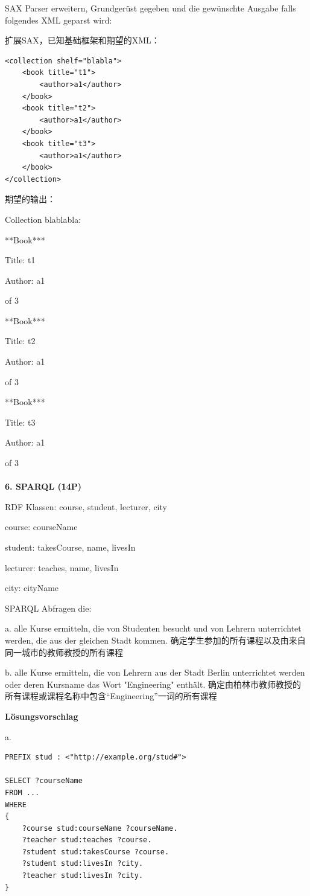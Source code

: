 \documentclass[fontset=windows]{article}
\begin{document}
SAX Parser erweitern, Grundgerüst gegeben und die gewünschte Ausgabe falls folgendes XML geparst wird:

扩展SAX，已知基础框架和期望的XML：

\begin{verbatim}
<collection shelf="blabla">
	<book title="t1">
		<author>a1</author>
	</book>
	<book title="t2">
		<author>a1</author>
	</book>
	<book title="t3">
		<author>a1</author>
	</book>
</collection>
\end{verbatim}

期望的输出：

\indent\indent Collection blablabla:

\indent\indent ***Book***

\indent\indent Title: t1

\indent\indent Author: a1

\indent{} of 3

\indent\indent ***Book***

\indent\indent Title: t2

\indent\indent Author: a1

\indent{} of 3

\indent\indent ***Book***

\indent\indent Title: t3

\indent\indent Author: a1

\indent{} of 3
\\
\\
\textbf{6. SPARQL (14P)}

RDF Klassen: course, student, lecturer, city

course: courseName

student: takesCourse, name, livesIn

lecturer: teaches, name, livesIn

city: cityName

SPARQL Abfragen die:

\indent a. alle Kurse ermitteln, die von Studenten besucht und von Lehrern unterrichtet werden, die aus der gleichen Stadt kommen. 确定学生参加的所有课程以及由来自同一城市的教师教授的所有课程

\indent b. alle Kurse ermitteln, die von Lehrern aus der Stadt Berlin unterrichtet werden oder deren Kursname das Wort "Engineering" enthält. 确定由柏林市教师教授的所有课程或课程名称中包含“Engineering”一词的所有课程

\textbf{Lösungsvorschlag}

a.
\begin{verbatim}
PREFIX stud : <"http://example.org/stud#">

SELECT ?courseName
FROM ...
WHERE
{
	?course stud:courseName ?courseName.
	?teacher stud:teaches ?course.
	?student stud:takesCourse ?course.
	?student stud:livesIn ?city.
	?teacher stud:livesIn ?city.
}
\end{verbatim}
\end{document}
